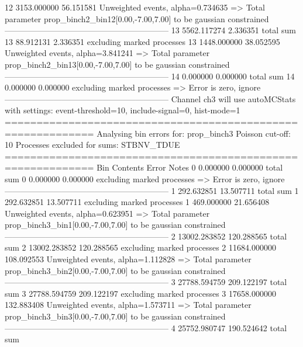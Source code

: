 12         3153.000000     56.151581       Unweighted events, alpha=0.734635
  => Total parameter prop_binch2_bin12[0.00,-7.00,7.00] to be gaussian constrained
------------------------------------------------------------
13         5562.117274     2.336351        total sum                     
13         88.912131       2.336351        excluding marked processes    
13         1448.000000     38.052595       Unweighted events, alpha=3.841241
  => Total parameter prop_binch2_bin13[0.00,-7.00,7.00] to be gaussian constrained
------------------------------------------------------------
14         0.000000        0.000000        total sum                     
14         0.000000        0.000000        excluding marked processes    
  => Error is zero, ignore      
------------------------------------------------------------
Channel ch3 will use autoMCStats with settings: event-threshold=10, include-signal=0, hist-mode=1
============================================================
Analysing bin errors for: prop_binch3
Poisson cut-off: 10
Processes excluded for sums: STBNV_TDUE
============================================================
Bin        Contents        Error           Notes                         
0          0.000000        0.000000        total sum                     
0          0.000000        0.000000        excluding marked processes    
  => Error is zero, ignore      
------------------------------------------------------------
1          292.632851      13.507711       total sum                     
1          292.632851      13.507711       excluding marked processes    
1          469.000000      21.656408       Unweighted events, alpha=0.623951
  => Total parameter prop_binch3_bin1[0.00,-7.00,7.00] to be gaussian constrained
------------------------------------------------------------
2          13002.283852    120.288565      total sum                     
2          13002.283852    120.288565      excluding marked processes    
2          11684.000000    108.092553      Unweighted events, alpha=1.112828
  => Total parameter prop_binch3_bin2[0.00,-7.00,7.00] to be gaussian constrained
------------------------------------------------------------
3          27788.594759    209.122197      total sum                     
3          27788.594759    209.122197      excluding marked processes    
3          17658.000000    132.883408      Unweighted events, alpha=1.573711
  => Total parameter prop_binch3_bin3[0.00,-7.00,7.00] to be gaussian constrained
------------------------------------------------------------
4          25752.980747    190.524642      total sum                     
